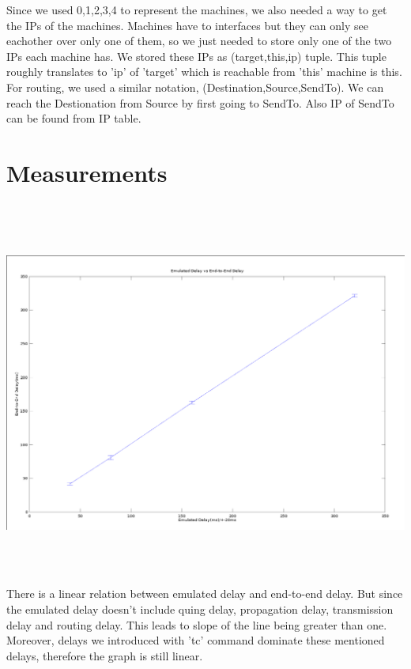 \documentclass[12pt]{article}
\begin{document}
Since we used 0,1,2,3,4 to represent the machines, we also needed a way to get the IPs of the machines. Machines have to interfaces but they can only see eachother over only one of them, so we just needed to store only one of the two IPs each machine has. We stored these IPs as (target,this,ip) tuple. This tuple roughly translates to 'ip' of 'target' which is reachable from 'this' machine is this.\\

For routing, we used a similar notation, (Destination,Source,SendTo). We can reach the Destionation from Source by first going to SendTo. Also IP of SendTo can be found from IP table.

\section*{Measurements}
\includegraphics[height=360pt]{image.png} \\

There is a linear relation between emulated delay and end-to-end delay. But since the emulated delay doesn't include quing delay, propagation delay, transmission delay and routing delay. This leads to slope of the line being greater than one. Moreover, delays we introduced with 'tc' command dominate these mentioned delays, therefore the graph is still linear.\\
\end{document}
